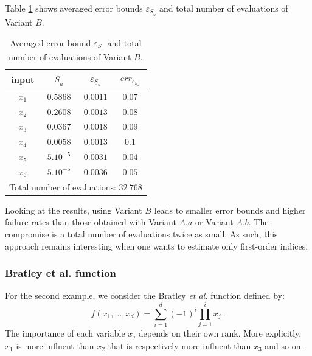 Table \ref{res.gfunc.B} shows averaged error bounds $\varepsilon_{\underline{S}_u}$ and total number of evaluations of Variant $B$. 
\begin{table}[!ht]
\caption{Averaged error bound $\varepsilon_{\underline{S}_u}$ and total number of evaluations of Variant $B$.}
\centering
\begin{tabular}{cccc}
\hline
 input & $\underline{S}_u$ & $\varepsilon_{\underline{S}_u}$ & ${err}_{\varepsilon_{\underline{S}_u}}$ \\ \hline
 $x_1$ & $0.5868$ &  $0.0011$ & $0.07$ \\ \hline
 $x_2$ & $0.2608$ &  $0.0013$ & $0.08$ \\ \hline
 $x_3$ & $0.0367$ &  $0.0018$ & $0.09$ \\ \hline
 $x_4$ & $0.0058$ &  $0.0013$ & $0.1$    \\ \hline
 $x_5$ & $5.10^{-5}$ & $0.0031$ & $0.04$  \\ \hline
 $x_6$ & $5.10^{-5}$ & $0.0036$ & $0.05$  \\ \hline \hline
\multicolumn{4}{l}{Total number of evaluations: $32 \ 768$}\\ \hline 
\end{tabular}
\label{res.gfunc.B}
\end{table}
Looking at the results, using Variant $B$ leads to smaller error bounds and higher failure rates than those obtained with Variant $A.a$ or Variant $A.b$. The compromise is a total number of evaluations twice as small. As such, this approach remains interesting when one wants to estimate only first-order indices.

\subsubsection{Bratley et al. function}

For the second example, we consider the Bratley \textit{et al.} function defined by:
$$f(x_1,\dots,x_d)=\sum \limits_{i=1}^{d} (-1)^i \prod \limits_{j=1}^{i} x_j \ .$$
The importance of each variable $x_j$ depends on their own rank. More explicitly, $x_1$ is more influent than $x_2$ that is respectively more influent than $x_3$ and so on. 

